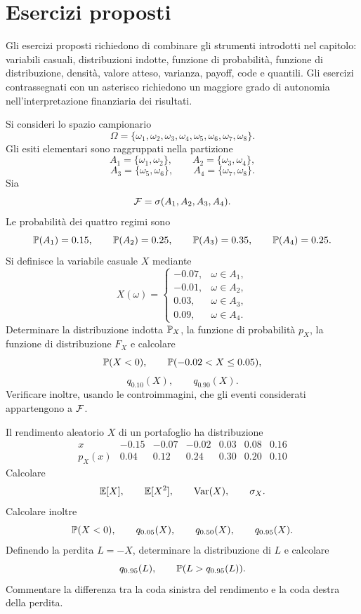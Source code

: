\section{Esercizi proposti}
\label{sec:cap2-esercizi-proposti}

Gli esercizi proposti richiedono di combinare gli strumenti introdotti nel
capitolo: variabili casuali, distribuzioni indotte, funzione di probabilit\`{a},
funzione di distribuzione, densit\`{a}, valore atteso, varianza, payoff, code e
quantili. Gli esercizi contrassegnati con un asterisco richiedono un maggiore
grado di autonomia nell'interpretazione finanziaria dei risultati.

\begin{exercise}
\label{ex:cap2-prop-distribuzione-indotta}

Si consideri lo spazio campionario
\[
\Omega=\{\omega_1,\omega_2,\omega_3,\omega_4,
\omega_5,\omega_6,\omega_7,\omega_8\}.
\]
Gli esiti elementari sono raggruppati nella partizione
\[
A_1=\{\omega_1,\omega_2\},
\qquad
A_2=\{\omega_3,\omega_4\},
\]
\[
A_3=\{\omega_5,\omega_6\},
\qquad
A_4=\{\omega_7,\omega_8\}.
\]
Sia
\[
\mathcal{F}=\sigma(A_1,A_2,A_3,A_4).
\]
Le probabilit\`{a} dei quattro regimi sono
\[
\mathbb{P}(A_1)=0.15,
\qquad
\mathbb{P}(A_2)=0.25,
\qquad
\mathbb{P}(A_3)=0.35,
\qquad
\mathbb{P}(A_4)=0.25.
\]
Si definisce la variabile casuale $X$ mediante
\[
X(\omega)=
\begin{cases}
-0.07, & \omega\in A_1,\\
-0.01, & \omega\in A_2,\\
0.03, & \omega\in A_3,\\
0.09, & \omega\in A_4.
\end{cases}
\]
Determinare la distribuzione indotta $\mathbb{P}_X$, la funzione di probabilit\`{a}
$p_X$, la funzione di distribuzione $F_X$ e calcolare
\[
\mathbb{P}(X<0),
\qquad
\mathbb{P}(-0.02<X\leq 0.05),
\]
\[
q_{0.10}(X),
\qquad
q_{0.90}(X).
\]
Verificare inoltre, usando le controimmagini, che gli eventi considerati
appartengono a $\mathcal{F}$.

\end{exercise}

\begin{exercise}
\label{ex:cap2-prop-rendimento-perdita-quantili}

Il rendimento aleatorio $X$ di un portafoglio ha distribuzione
\[
\begin{array}{c|cccccc}
x & -0.15 & -0.07 & -0.02 & 0.03 & 0.08 & 0.16\\
\hline
p_X(x) & 0.04 & 0.12 & 0.24 & 0.30 & 0.20 & 0.10
\end{array}
\]
Calcolare
\[
\mathbb{E}[X],
\qquad
\mathbb{E}[X^2],
\qquad
\operatorname{Var}(X),
\qquad
\sigma_X.
\]
Calcolare inoltre
\[
\mathbb{P}(X<0),
\qquad
q_{0.05}(X),
\qquad
q_{0.50}(X),
\qquad
q_{0.95}(X).
\]
Definendo la perdita $L=-X$, determinare la distribuzione di $L$ e calcolare
\[
q_{0.95}(L),
\qquad
\mathbb{P}(L>q_{0.95}(L)).
\]
Commentare la differenza tra la coda sinistra del rendimento e la coda destra
della perdita.

\end{exercise}

